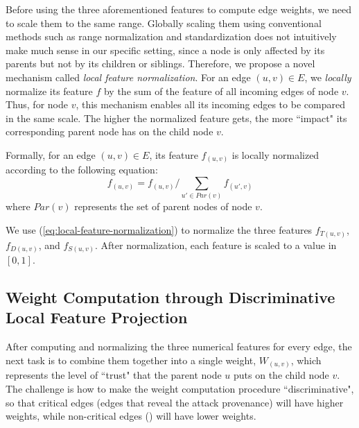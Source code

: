 Before using the three aforementioned features to compute edge weights, we need to scale them to the same range. 
Globally scaling them using conventional methods such as range normalization and standardization does not intuitively make much sense in our specific setting, since a node is only affected by its parents but not by its children or siblings. 
Therefore, we propose a novel mechanism called \emph{local feature normalization}. For an edge $(u, v) \in E$, we \emph{locally} normalize its feature $f$ by the sum of the feature of all incoming edges of node $v$. Thus, for node $v$, this mechanism enables all its incoming edges to be compared in the same scale. The higher the normalized feature gets, the more ``impact" its corresponding parent node has on the child node $v$.

Formally, for an edge $(u, v)\in E$, its feature $f_{(u, v)}$ is locally normalized according to the following equation:
\begin{equation}
    \label{eq:local-feature-normalization}
    f_{(u, v)} = f_{(u, v)}/\sum_{u' \in Par(v)} f_{(u', v)}
\end{equation}
where $Par(v)$ represents the set of parent nodes of node $v$.

We use (\ref{eq:local-feature-normalization}) to normalize the three features $f_{T(u, v)}$, $f_{D(u, v)}$, and $f_{S(u, v)}$. After normalization, each feature is scaled to a value in $[0, 1]$.



\subsection{Weight Computation through Discriminative Local Feature Projection}
\label{subsubsec:weight-computation}

After computing and normalizing the three numerical features for every edge, the next task is to combine them together into a single weight, $W_{(u, v)}$, which represents the level of ``trust" that the parent node $u$ puts on the child node $v$.
The challenge is how to make the weight computation procedure ``discriminative", so that critical edges (\ie edges that reveal the attack provenance) will have higher weights, while non-critical edges () will have lower weights.

